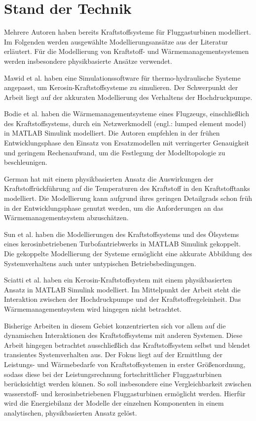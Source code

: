\chapter{Stand der Technik}\label{chap:standdertechnik}

Mehrere Autoren haben bereits Kraftstoffsysteme für Fluggasturbinen modelliert. Im Folgenden werden ausgewählte Modellierungsansätze aus der Literatur erläutert. Für die Modellierung von Kraftstoff- und Wärmemanagementsystemen werden insbesondere physikbasierte Ansätze verwendet.

Mawid et al. \cite{Mawid.1998} haben eine Simulationssoftware für thermo-hydraulische Systeme angepasst, um  Kerosin-Kraftstoffsysteme zu simulieren. Der Schwerpunkt der Arbeit liegt auf der akkuraten Modellierung des Verhaltens der Hochdruckpumpe.

Bodie et al. \cite{Bodie.2010} haben die Wärmemanagementsysteme eines Flugzeugs, einschließlich des Kraftstoffsystems, durch ein Netzwerkmodell (engl.: lumped element model) in MATLAB Simulink modelliert. Die Autoren empfehlen in der frühen Entwicklungsphase den Einsatz von Ersatzmodellen mit verringerter Genauigkeit und geringem Rechenaufwand, um die Festlegung der Modelltopologie zu beschleunigen.

German \cite{German.2012} hat mit einem physikbasierten Ansatz die Auswirkungen der Kraftstoffrückführung auf die Temperaturen des Kraftstoff in den Kraftstofftanks modelliert. Die Modellierung kann aufgrund ihres geringen Detailgrads schon früh in der Entwicklungsphase genutzt werden, um die Anforderungen an das Wärmemanagementsystem abzuschätzen.

Sun et al. \cite{Sun.2019} haben die Modellierungen des Kraftstoffsystems und des Ölsystems eines kerosinbetriebenen Turbofantriebwerks in MATLAB Simulink gekoppelt. Die gekoppelte Modellierung der Systeme ermöglicht eine akkurate Abbildung des Systemverhaltens auch unter untypischen Betriebsbedingungen.

Sciatti et al. \cite{Sciatti.2022} haben ein Kerosin-Kraftstoffsystem mit einem physikbasierten Ansatz in MATLAB Simulink modelliert. Im Mittelpunkt der Arbeit steht die Interaktion zwischen der Hochdruckpumpe und der Kraftstoffregeleinheit. Das Wärmemanagementsystem wird hingegen nicht betrachtet. 

Bisherige Arbeiten in diesem Gebiet konzentrierten sich vor allem auf die dynamischen Interaktionen des Kraftstoffsystems mit anderen Systemen. Diese Arbeit hingegen betrachtet ausschließlich das Kraftstoffsystem selbst und blendet transientes Systemverhalten aus. Der Fokus liegt auf der Ermittlung der Leistungs- und Wärmebedarfe von Kraftstoffsystemen in erster Größenordnung, sodass diese bei der Leistungsrechnung fortschrittlicher Fluggasturbinen berücksichtigt werden können. So soll insbesondere eine Vergleichbarkeit zwischen wasserstoff- und kerosinbetriebenen Fluggasturbinen ermöglicht werden. Hierfür wird die Energiebilanz der Modelle der einzelnen Komponenten in einem analytischen, physikbasierten Ansatz gelöst. 